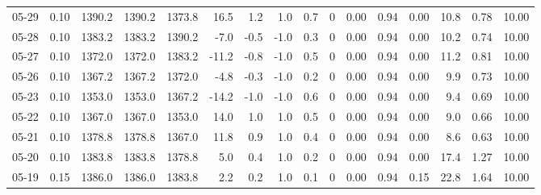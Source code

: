 \begin{threeparttable}
{\begin{tabular}{lrrrrrrrrrrrrrrr}
  05-29 &     0.10 & 1390.2 & 1390.2 & 1373.8 &       16.5 &            1.2 &                      1.0 &                 0.7 &              0 &       0.00 &      0.94 &           0.00 &             10.8 &            0.78 &                  10.00 \\
  05-28 &     0.10 & 1383.2 & 1383.2 & 1390.2 &       -7.0 &           -0.5 &                     -1.0 &                 0.3 &              0 &       0.00 &      0.94 &           0.00 &             10.2 &            0.74 &                  10.00 \\
  05-27 &     0.10 & 1372.0 & 1372.0 & 1383.2 &      -11.2 &           -0.8 &                     -1.0 &                 0.5 &              0 &       0.00 &      0.94 &           0.00 &             11.2 &            0.81 &                  10.00 \\
  05-26 &     0.10 & 1367.2 & 1367.2 & 1372.0 &       -4.8 &           -0.3 &                     -1.0 &                 0.2 &              0 &       0.00 &      0.94 &           0.00 &              9.9 &            0.73 &                  10.00 \\
  05-23 &     0.10 & 1353.0 & 1353.0 & 1367.2 &      -14.2 &           -1.0 &                     -1.0 &                 0.6 &              0 &       0.00 &      0.94 &           0.00 &              9.4 &            0.69 &                  10.00 \\
  05-22 &     0.10 & 1367.0 & 1367.0 & 1353.0 &       14.0 &            1.0 &                      1.0 &                 0.5 &              0 &       0.00 &      0.94 &           0.00 &              9.0 &            0.66 &                  10.00 \\
  05-21 &     0.10 & 1378.8 & 1378.8 & 1367.0 &       11.8 &            0.9 &                      1.0 &                 0.4 &              0 &       0.00 &      0.94 &           0.00 &              8.6 &            0.63 &                  10.00 \\
  05-20 &     0.10 & 1383.8 & 1383.8 & 1378.8 &        5.0 &            0.4 &                      1.0 &                 0.2 &              0 &       0.00 &      0.94 &           0.00 &             17.4 &            1.27 &                  10.00 \\
  05-19 &     0.15 & 1386.0 & 1386.0 & 1383.8 &        2.2 &            0.2 &                      1.0 &                 0.1 &              0 &       0.00 &      0.94 &           0.15 &             22.8 &            1.64 &                  10.00 \\

\end{tabular}}
\end{threeparttable}
